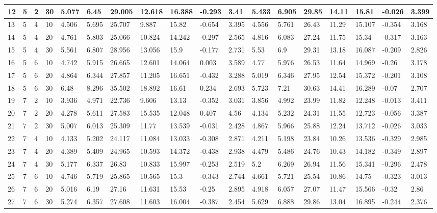 \documentclass{interact}
\begin{document}
\begin{landscape}
\begin{tabular}{|l|l|l|l|l|l|l|l|l|l|l|l|l|l|l|l|l|l|}
        12 & 5 & 2 & 30 & 5.077 & 6.45 & 29.005 & 12.618 & 16.388 & -0.293 & 3.41 & 5.433 & 6.905 & 29.85 & 14.11 & 15.81 & -0.026 & 3.399 \\ \hline
        13 & 5 & 4 & 10 & 4.506 & 5.695 & 25.707 & 9.887 & 15.82 & -0.654 & 3.395 & 4.556 & 5.761 & 26.43 & 11.29 & 15.107 & -0.354 & 3.168 \\ \hline
        14 & 5 & 4 & 20 & 4.761 & 5.803 & 25.066 & 10.824 & 14.242 & -0.297 & 2.565 & 4.816 & 6.083 & 27.24 & 11.75 & 15.34 & -0.317 & 3.163 \\ \hline
        15 & 5 & 4 & 30 & 5.561 & 6.807 & 28.956 & 13.056 & 15.9 & -0.177 & 2.731 & 5.53 & 6.9 & 29.31 & 13.18 & 16.087 & -0.209 & 2.826 \\ \hline
        16 & 5 & 6 & 10 & 4.742 & 5.915 & 26.665 & 12.601 & 14.064 & 0.003 & 3.589 & 4.77 & 5.976 & 26.53 & 11.64 & 14.969 & -0.26 & 3.178 \\ \hline
        17 & 5 & 6 & 20 & 4.864 & 6.344 & 27.857 & 11.205 & 16.651 & -0.432 & 3.288 & 5.019 & 6.346 & 27.95 & 12.54 & 15.372 & -0.201 & 3.108 \\ \hline
        18 & 5 & 6 & 30 & 6.48 & 8.296 & 35.502 & 18.892 & 16.61 & 0.234 & 2.693 & 5.723 & 7.21 & 30.63 & 14.41 & 16.289 & -0.07 & 2.707 \\ \hline
        19 & 7 & 2 & 10 & 3.936 & 4.971 & 22.736 & 9.606 & 13.13 & -0.352 & 3.031 & 3.856 & 4.992 & 23.99 & 11.82 & 12.248 & -0.013 & 3.411 \\ \hline
        20 & 7 & 2 & 20 & 4.278 & 5.611 & 27.583 & 15.535 & 12.048 & 0.407 & 4.56 & 4.134 & 5.232 & 24.31 & 11.55 & 12.723 & -0.056 & 3.387 \\ \hline
        21 & 7 & 2 & 30 & 5.007 & 6.013 & 25.309 & 11.77 & 13.539 & -0.031 & 2.428 & 4.867 & 5.966 & 25.88 & 12.24 & 13.712 & -0.026 & 3.033 \\ \hline
        22 & 7 & 4 & 10 & 4.133 & 5.202 & 24.117 & 11.084 & 13.033 & -0.308 & 2.871 & 4.211 & 5.198 & 23.84 & 10.26 & 13.536 & -0.329 & 2.985 \\ \hline
        23 & 7 & 4 & 20 & 4.389 & 5.409 & 24.965 & 10.593 & 14.372 & -0.438 & 2.938 & 4.479 & 5.486 & 24.76 & 10.43 & 14.182 & -0.349 & 2.897 \\ \hline
        24 & 7 & 4 & 30 & 5.177 & 6.337 & 26.83 & 10.833 & 15.997 & -0.253 & 2.519 & 5.2 & 6.269 & 26.94 & 11.56 & 15.341 & -0.296 & 2.478 \\ \hline
        25 & 7 & 6 & 10 & 4.746 & 5.719 & 25.865 & 10.565 & 15.3 & -0.343 & 2.744 & 4.661 & 5.721 & 25.54 & 10.86 & 14.75 & -0.323 & 3.013 \\ \hline
        26 & 7 & 6 & 20 & 5.016 & 6.19 & 27.16 & 11.631 & 15.53 & -0.25 & 2.895 & 4.918 & 6.057 & 27.07 & 11.47 & 15.566 & -0.32 & 2.86 \\ \hline
        27 & 7 & 6 & 30 & 5.274 & 6.357 & 27.608 & 11.603 & 16.004 & -0.387 & 2.454 & 5.629 & 6.888 & 29.86 & 13.04 & 16.895 & -0.244 & 2.376 \\ \hline
    \end{tabular}
\end{landscape}
\end{document}
